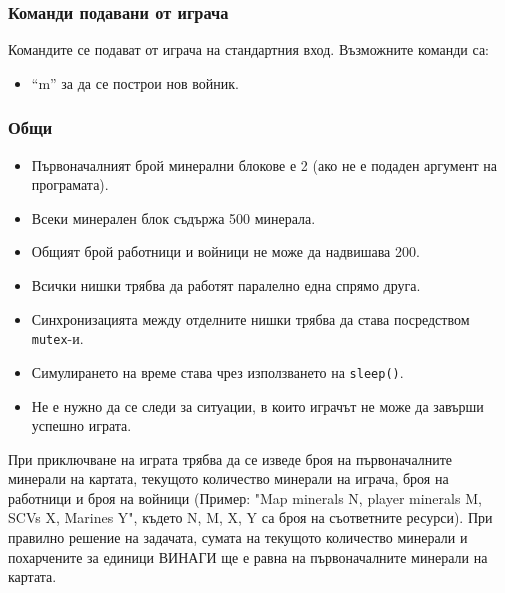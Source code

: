 \documentclass[a4paper,10pt]{article}
\begin{document}
			\subsubsection{Команди подавани от играча}
			Командите се подават от играча на стандартния вход. Възможните команди са:
			\begin{itemize}
				\item ``m'' за да се построи нов войник.
			\end{itemize}
			
			\subsubsection{Общи}
			\begin{itemize}
				\item Първоначалният брой минерални блокове е 2 (ако не е подаден аргумент на програмата).
				\item Всеки минерален блок съдържа 500 минерала.
				\item Общият брой работници и войници не може да надвишава 200.
				\item Всички нишки трябва да работят паралелно една спрямо друга.
				\item Синхронизацията между отделните нишки трябва да става посредством \verb|mutex|-и.
				\item Симулирането на време става чрез използването на \verb|sleep()|.
				\item Не е нужно да се следи за ситуации, в които играчът не може да завърши успешно играта.
			\end{itemize}
			
			При приключване на играта трябва да се изведе броя на първоначалните минерали на картата, текущото количество минерали на играча, броя на работници и броя на войници (Пример: "Map minerals N, player minerals M, SCVs X, Marines Y\n", където N, M, X, Y са броя на съответните ресурси). При правилно решение на задачата, сумата на текущото количество минерали и похарчените за единици ВИНАГИ ще е равна на първоначалните минерали на картата.
			
\end{document}
